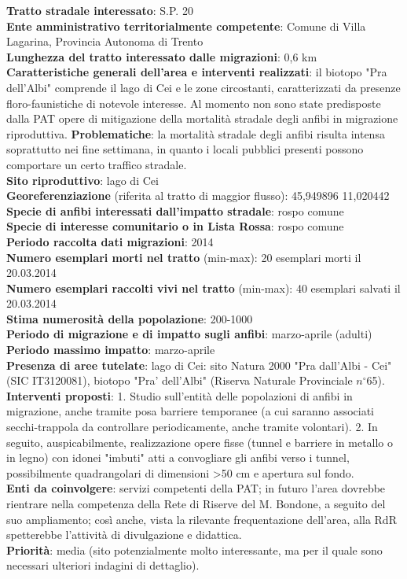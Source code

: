 \documentclass[11pt,a4paper,twoside]{memoir}
\begin{document}
\textbf{Tratto stradale interessato}: S.P. 20 \\
\textbf{Ente amministrativo territorialmente competente}: Comune di Villa Lagarina, Provincia Autonoma di Trento \\
\textbf{Lunghezza del tratto interessato dalle migrazioni}: 0,6 km \\
\textbf{Caratteristiche generali dell’area e interventi realizzati}: il biotopo "Pra dell'Albi" comprende il lago di Cei e le zone circostanti, caratterizzati da presenze floro-faunistiche di notevole interesse. Al momento non sono state predisposte dalla PAT opere di mitigazione della mortalità stradale degli anfibi in migrazione riproduttiva.  
\textbf{Problematiche}: la mortalità stradale degli anfibi risulta intensa soprattutto nei fine settimana, in quanto i locali pubblici presenti possono comportare un certo traffico stradale. \\
\textbf{Sito riproduttivo}: lago di Cei \\
\textbf{Georeferenziazione} (riferita al tratto di maggior flusso): 45,949896 11,020442 \\
\textbf{Specie di anfibi interessati dall’impatto stradale}: rospo comune \\
\textbf{Specie di interesse comunitario o in Lista Rossa}: rospo comune \\
\textbf{Periodo raccolta dati migrazioni}: 2014 \\
\textbf{Numero esemplari morti nel tratto} (min-max): 20 esemplari morti il 20.03.2014 \\
\textbf{Numero esemplari raccolti vivi nel tratto} (min-max): 40 esemplari salvati il 20.03.2014 \\
\textbf{Stima numerosità della popolazione}: 200-1000 \\
\textbf{Periodo di migrazione e di impatto sugli anfibi}: marzo-aprile (adulti) \\
\textbf{Periodo massimo impatto}: marzo-aprile \\
\textbf{Presenza di aree tutelate}: lago di Cei: sito Natura 2000 "Pra dall'Albi - Cei" (SIC IT3120081), biotopo "Pra' dell'Albi" (Riserva Naturale Provinciale $n^{\circ}$65).
\textbf{Interventi proposti}: 1. Studio sull'entità delle popolazioni di anfibi in migrazione, anche tramite posa barriere temporanee (a cui saranno associati secchi-trappola da controllare periodicamente, anche tramite volontari). 2. In seguito, auspicabilmente, realizzazione opere fisse (tunnel e barriere in metallo o in legno) con idonei "imbuti" atti a convogliare gli anfibi verso i tunnel, possibilmente quadrangolari di dimensioni >50 cm e apertura sul fondo. \\
\textbf{Enti da coinvolgere}: servizi competenti della PAT; in futuro l’area dovrebbe rientrare nella competenza della Rete di Riserve del M. Bondone, a seguito del suo ampliamento; così anche, vista la rilevante frequentazione dell’area, alla RdR spetterebbe l’attività di divulgazione e didattica. \\
\textbf{Priorità}: media (sito potenzialmente molto interessante, ma per il quale sono necessari ulteriori indagini di dettaglio). \\
\end{document}
